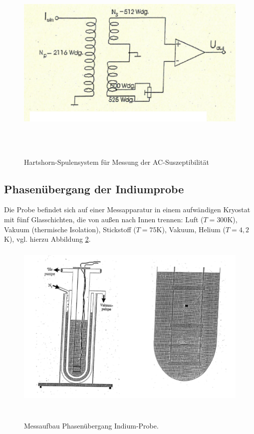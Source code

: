 \begin{figure}[h!]
	\centering
	\includegraphics[height=8cm]{AC-auf.png}	
	~ %
	\caption{Hartshorn-Spulensystem für Messung der AC-Suszeptibilität \cite{Anleitung}}
	\label{aufbau-AC}
\end{figure}

\subsection{Phasenübergang der Indiumprobe}
Die Probe befindet sich auf einer Messapparatur in einem aufwändigen Kryostat mit fünf Glasschichten, die von außen nach Innen trennen: Luft ($T=300$K), Vakuum (thermische Isolation), Stickstoff ($T=75$K), Vakuum, Helium ($T=4,2$K), vgl. hierzu Abbildung \ref{aufbau}.

\begin{figure}[h!]
	\centering
	\includegraphics[height=8cm]{Aufbau.png}	
	~ %
	\caption{Messaufbau Phasenübergang Indium-Probe. \cite{Anleitung}}
	\label{aufbau}
\end{figure}

